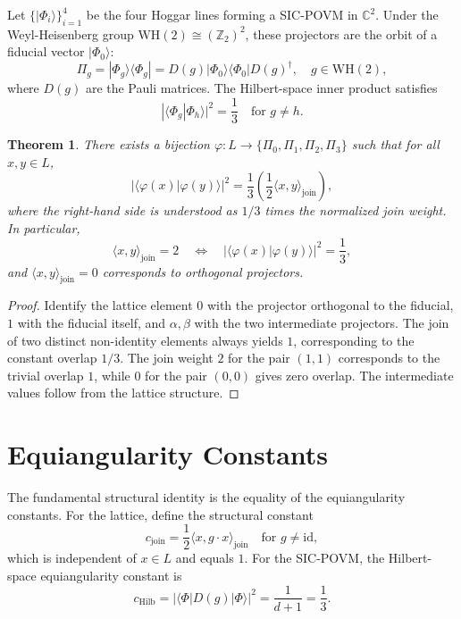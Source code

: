 \documentclass{article}
\newtheorem{theorem}{Theorem}
\begin{document}
Let $\{|\Phi_i\rangle\}_{i=1}^4$ be the four Hoggar lines forming a SIC-POVM in $\mathbb{C}^2$. Under the Weyl-Heisenberg group $\mathrm{WH}(2) \cong (\mathbb{Z}_2)^2$, these projectors are the orbit of a fiducial vector $|\Phi_0\rangle$:
\begin{equation}
\Pi_g = |\Phi_g\rangle\langle\Phi_g| = D(g) |\Phi_0\rangle\langle\Phi_0| D(g)^\dagger, \quad g \in \mathrm{WH}(2),
\end{equation}
where $D(g)$ are the Pauli matrices. The Hilbert-space inner product satisfies
\begin{equation}
|\langle \Phi_g | \Phi_h \rangle|^2 = \frac{1}{3} \quad \text{for } g \neq h.
\end{equation}

\begin{theorem}
There exists a bijection $\varphi: L \to \{\Pi_0, \Pi_1, \Pi_2, \Pi_3\}$ such that for all $x, y \in L$,
\begin{equation}
|\langle \varphi(x) | \varphi(y) \rangle|^2 = \frac{1}{3} \left( \frac{1}{2} \langle x, y \rangle_{\text{join}} \right),
\end{equation}
where the right-hand side is understood as $1/3$ times the normalized join weight. In particular,
\begin{equation}
\langle x, y \rangle_{\text{join}} = 2 \quad \Leftrightarrow \quad |\langle \varphi(x) | \varphi(y) \rangle|^2 = \frac{1}{3},
\end{equation}
and $\langle x, y \rangle_{\text{join}} = 0$ corresponds to orthogonal projectors.
\end{theorem}

\begin{proof}
Identify the lattice element $0$ with the projector orthogonal to the fiducial, $1$ with the fiducial itself, and $\alpha, \beta$ with the two intermediate projectors. The join of two distinct non-identity elements always yields $1$, corresponding to the constant overlap $1/3$. The join weight $2$ for the pair $(1,1)$ corresponds to the trivial overlap $1$, while $0$ for the pair $(0,0)$ gives zero overlap. The intermediate values follow from the lattice structure.
\end{proof}

\section{Equiangularity Constants}

The fundamental structural identity is the equality of the equiangularity constants. For the lattice, define the structural constant
\begin{equation}
c_{\text{join}} = \frac{1}{2} \langle x, g \cdot x \rangle_{\text{join}} \quad \text{for } g \neq \mathrm{id},
\end{equation}
which is independent of $x \in L$ and equals $1$. For the SIC-POVM, the Hilbert-space equiangularity constant is
\begin{equation}
c_{\text{Hilb}} = |\langle \Phi | D(g) | \Phi \rangle|^2 = \frac{1}{d+1} = \frac{1}{3}.
\end{equation}
\end{document}
